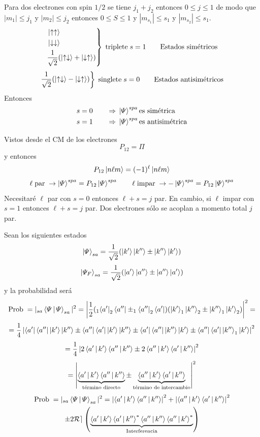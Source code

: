 \documentclass[10pt,oneside]{CBFT_book}
\begin{document}
Para dos electrones con spin $1/2$ se tiene $j_1+j_2$ entonces $ 0 \leq j \leq 1 $ de modo que $|m_1|\leq j_1$ y
$|m_2|\leq j_2$ entonces $0 \leq S \leq 1$ y $|m_{s_1}|\leq s_1$ y $|m_{s_2}|\leq s_1$.
\[
	\left.\begin{aligned}
	& \Ket{\uparrow \uparrow} \\
	& \Ket{\downarrow \downarrow } \\
	& \frac{1}{\sqrt{2}}( \Ket{ \uparrow\downarrow }+\Ket{ \downarrow\uparrow} )
	\end{aligned}
	\right\} \; \text{triplete} \; s=1 \qquad \text{Estados simétricos}
\]
\[
	\left.\begin{aligned}
	\frac{1}{\sqrt{2}}( \Ket{\uparrow\downarrow} - \Ket{\downarrow\uparrow} )
	\end{aligned}
	\right\} \; \text{singlete} \; s=0 \qquad \text{Estados antisimétricos}
\]
Entonces
\begin{gather*}
	\begin{aligned}
	s=0 \qquad \Rightarrow \; &\Ket{\Psi}^{spa} \text{es simétrica} \\
	s=1 \qquad \Rightarrow \; &\Ket{\Psi}^{spa} \text{es antisimétrica}
	\end{aligned}	
\end{gather*}	

Vistos desde el CM de los electrones
\[
	P_{12} = \Pi
\]
y entonces
\[
	P_{12}\Ket{n\ell m} = (-1)^\ell \Ket{n\ell m}
\]
\[
	\ell \;\text{par} \; \rightarrow \Ket{\Psi}^{spa} = P_{12} \Ket{\Psi}^{spa} \qquad 
	\ell \;\text{impar} \; \rightarrow -\Ket{\Psi}^{spa} = P_{12} \Ket{\Psi}^{spa}
\]
Necesitaré $\ell$ par con $s=0$ entonces $\ell+s=j$ par. En cambio, si $\ell$ impar con $s=1$ entonces 
$\ell+s=j$ par. Dos electrones sólo se acoplan a momento total $j$ par.

Sean los siguientes estados 
\[
	\Ket{ \Psi }_{sa} = \frac{1}{\sqrt{2}}( \Ket{k'}\Ket{k''} \pm \Ket{k''}\Ket{k'})
\]
\[
	\Ket{ \Psi_F }_{sa} = \frac{1}{\sqrt{2}}( \Ket{a'}\Ket{a''} \pm \Ket{a''}\Ket{a'})
\]
y la probabilidad será
\[
	\text{Prob}\; = |_{sa}\Braket{\Psi|\Psi}_{sa}|^2 = 
	\left|\frac{1}{2}(_1\Bra{a'}_2\Bra{a''} \pm _1\Bra{a''}_2\Bra{a'})(\Ket{k'}_1\Ket{k''}_2 \pm 
	\Ket{k''}_1\Ket{k'}_2)\right|^2 =
\]
\[
	= \frac{1}{4}\left| \Bra{a'}\Bra{a''}\Ket{k'}\Ket{k''} \pm \Bra{a''}\Bra{a'}\Ket{k'}\Ket{k''} 
	\pm \Bra{a'}\Bra{a''}\Ket{k''}\Ket{k'} \pm \Bra{a''}\Bra{a'}\Ket{k''}_1\Ket{k'} \right|^2
\]
\[
	= \frac{1}{4}\left| 2\Braket{a'|k'}\Braket{a''|k''} \pm 2\Braket{a''|k'}\Braket{a'|k''}\right|^2
\]
\[
	= \left| \underbrace{\Braket{a'|k'}\Braket{a''|k''}}_{\text{término directo}} \pm 
	\underbrace{\Braket{a''|k'}\Braket{a'|k''}}_\text{término de intercambio}\right|^2
\]
\begin{multline*}
	\text{Prob}\; = |_{sa}\Braket{\Psi|\Psi}_{sa}|^2 = \left| \Braket{a'|k'}\Braket{a''|k''} \right|^2 + 
	\left|\Braket{a''|k'}\Braket{a'|k''}\right|^2 \\
	\pm 2\mathcal{Re}\left(\underbrace{ \Braket{a'|k'}\Braket{a'|k''}^*\Braket{a''|k''}\Braket{a''|k'}^* 
	}_\text{Interferencia}\right)
\end{multline*}
\end{document}
